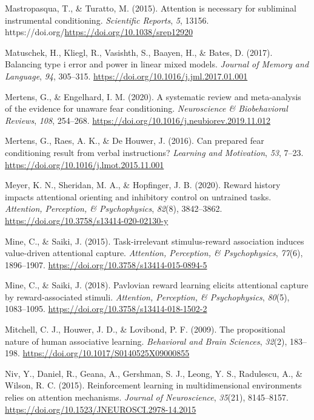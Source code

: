 \documentclass[
  man,
  floatsintext,
  longtable,
  nolmodern,
  notxfonts,
  notimes,
  mask,
  colorlinks=true,linkcolor=blue,citecolor=blue,urlcolor=blue]{apa7}
\newlength{\cslhangindent}
\newenvironment{CSLReferences}[2] %
 {\begin{list}{}{%
  \setlength{\itemindent}{0pt}
  \setlength{\leftmargin}{0pt}
  \setlength{\parsep}{0pt}
  \ifodd #1
   \setlength{\leftmargin}{\cslhangindent}
   \setlength{\itemindent}{-1\cslhangindent}
  \fi
  \setlength{\itemsep}{#2\baselineskip}}}
 {\end{list}}
\begin{document}
\begin{CSLReferences}{1}{0}
Mastropasqua, T., \& Turatto, M. (2015). Attention is necessary for
subliminal instrumental conditioning. \emph{Scientific Reports},
\emph{5}, 13156. https://doi.org/\url{https://doi.org/10.1038/srep12920}

Matuschek, H., Kliegl, R., Vasishth, S., Baayen, H., \& Bates, D.
(2017). Balancing type i error and power in linear mixed models.
\emph{Journal of Memory and Language}, \emph{94}, 305--315.
\url{https://doi.org/10.1016/j.jml.2017.01.001}

Mertens, G., \& Engelhard, I. M. (2020). A systematic review and
meta-analysis of the evidence for unaware fear conditioning.
\emph{Neuroscience \& Biobehavioral Reviews}, \emph{108}, 254--268.
\url{https://doi.org/10.1016/j.neubiorev.2019.11.012}

Mertens, G., Raes, A. K., \& De Houwer, J. (2016). Can prepared fear
conditioning result from verbal instructions? \emph{Learning and
Motivation}, \emph{53}, 7--23.
\url{https://doi.org/10.1016/j.lmot.2015.11.001}

Meyer, K. N., Sheridan, M. A., \& Hopfinger, J. B. (2020). Reward
history impacts attentional orienting and inhibitory control on
untrained tasks. \emph{Attention, Perception, \& Psychophysics},
\emph{82}(8), 3842--3862.
\url{https://doi.org/10.3758/s13414-020-02130-y}

Mine, C., \& Saiki, J. (2015). Task-irrelevant stimulus-reward
association induces value-driven attentional capture. \emph{Attention,
Perception, \& Psychophysics}, \emph{77}(6), 1896--1907.
\url{https://doi.org/10.3758/s13414-015-0894-5}

Mine, C., \& Saiki, J. (2018). Pavlovian reward learning elicits
attentional capture by reward-associated stimuli. \emph{Attention,
Perception, \& Psychophysics}, \emph{80}(5), 1083--1095.
\url{https://doi.org/10.3758/s13414-018-1502-2}

Mitchell, C. J., Houwer, J. D., \& Lovibond, P. F. (2009). The
propositional nature of human associative learning. \emph{Behavioral and
Brain Sciences}, \emph{32}(2), 183--198.
\url{https://doi.org/10.1017/S0140525X09000855}

Niv, Y., Daniel, R., Geana, A., Gershman, S. J., Leong, Y. S.,
Radulescu, A., \& Wilson, R. C. (2015). Reinforcement learning in
multidimensional environments relies on attention mechanisms.
\emph{Journal of Neuroscience}, \emph{35}(21), 8145--8157.
\url{https://doi.org/10.1523/JNEUROSCI.2978-14.2015}


\end{CSLReferences}
\end{document}
